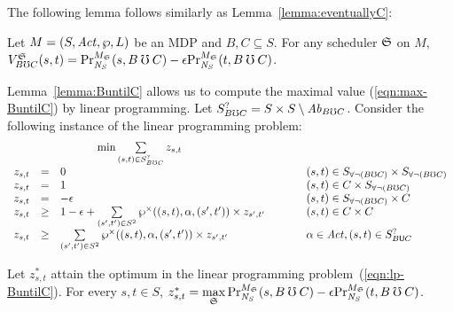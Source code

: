The following lemma follows similarly as Lemma~\ref{lemma:eventuallyC}:
\begin{lemma}
  Let $M = (S, \Act, \wp, L)$ be an MDP and $B, C \subseteq S$.
  For any scheduler $\scheduler{S}$ on $M$,
  $V^{\scheduler{S}}_{B \guntil C} (s, t) =
  \myPr{s}{M_{\scheduler{S}}}{\neighbor{S}}{B \guntil C} -
  \epsilon \myPr{t}{M_{\scheduler{S}}}{\neighbor{S}}{B \guntil C}$.
  \label{lemma:BuntilC}
\end{lemma}

Lemma~\ref{lemma:BuntilC} allows us to compute the maximal value
(\ref{eqn:max-BuntilC}) by linear programming.
Let ${S}^{?}_{B \guntil C} = S \times S \setminus
\mathit{Ab}_{B \guntil C}$. Consider the following instance of the
linear programming problem:
\begin{eqnarray}
  \label{eqn:lp-BuntilC}
\begin{array}{rclll}
  \multicolumn{3}{c}{
  \min \sum\limits_{(s, t) \in {S}^{?}_{B \guntil C}} z_{s, t}
  }\\
  z_{s, t} & = & 0 & \hspace{.05\columnwidth} &
  (s, t) \in \neverBuntilC \times \neverBuntilC\\
  z_{s, t} & = & 1 &&
  (s, t) \in C \times \neverBuntilC\\
  z_{s, t} & = & - \epsilon &&
  (s, t) \in \neverBuntilC \times C\\
  z_{s, t} & \geq & 1 - \epsilon +
  \sum\limits_{(s', t') \in {S}^{2}}
   \wp^{\times} ((s, t), \alpha, (s', t')) \times z_{s', t'} &&
  (s, t) \in C \times C\\
  z_{s, t} &\geq& \sum\limits_{(s', t') \in
  {S}^{2}}
   \wp^{\times} ((s, t), \alpha, (s', t')) \times z_{s', t'}
  &&
  \alpha \in \Act, (s, t) \in {S}^{?}_{B \until C}
\end{array}
\end{eqnarray}

\begin{theorem}
  Let $z^*_{s, t}$ attain the optimum in the linear programming
  problem~(\ref{eqn:lp-BuntilC}). For every $s, t \in S$,
  $z^*_{s, t} = \max\limits_{\scheduler{S}}
  \myPr{s}{M_{\scheduler{S}}}{\neighbor{S}}{B \guntil C} -
  \epsilon \myPr{t}{M_{\scheduler{S}}}{\neighbor{S}}{B \guntil C}$.
  \label{theorem:BuntilC}
\end{theorem}

